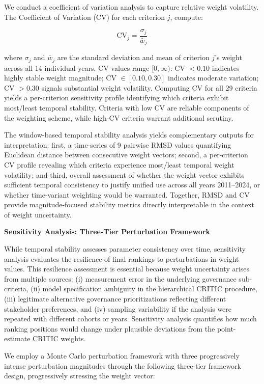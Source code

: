 \documentclass[12pt,a4paper]{article}
\begin{document}
We conduct a coefficient of variation analysis to capture relative weight volatility. The Coefficient of Variation (CV) for each criterion $j$, compute:

\begin{equation}
\text{CV}_j = \frac{\sigma_j}{\bar{w}_j}
\end{equation}

where $\sigma_j$ and $\bar{w}_j$ are the standard deviation and mean of criterion $j$'s weight across all 14 individual years. CV values range $[0, \infty)$: CV $< 0.10$ indicates highly stable weight magnitude; CV $\in [0.10, 0.30]$ indicates moderate variation; CV $> 0.30$ signals substantial weight volatility. Computing CV for all 29 criteria yields a per-criterion sensitivity profile identifying which criteria exhibit most/least temporal stability. Criteria with low CV are reliable components of the weighting scheme, while high-CV criteria warrant additional scrutiny.

The window-based temporal stability analysis yields complementary outputs for interpretation: first, a time-series of 9 pairwise RMSD values quantifying Euclidean distance between consecutive weight vectors; second, a per-criterion CV profile revealing which criteria experience most/least temporal weight volatility; and third, overall assessment of whether the weight vector exhibits sufficient temporal consistency to justify unified use across all years 2011--2024, or whether time-variant weighting would be warranted. Together, RMSD and CV provide magnitude-focused stability metrics directly interpretable in the context of weight uncertainty.

\textbf{Sensitivity Analysis: Three-Tier Perturbation Framework}

While temporal stability assesses parameter consistency over time, sensitivity analysis evaluates the resilience of final rankings to perturbations in weight values. This resilience assessment is essential because weight uncertainty arises from multiple sources: (i) measurement error in the underlying governance sub-criteria, (ii) model specification ambiguity in the hierarchical CRITIC procedure, (iii) legitimate alternative governance prioritizations reflecting different stakeholder preferences, and (iv) sampling variability if the analysis were repeated with different cohorts or years. Sensitivity analysis quantifies how much ranking positions would change under plausible deviations from the point-estimate CRITIC weights.

We employ a Monte Carlo perturbation framework with three progressively intense perturbation magnitudes through the following three-tier framework design, progressively stressing the weight vector:
\end{document}
